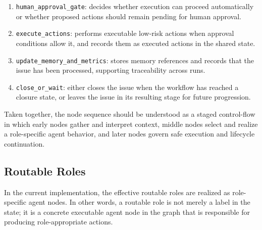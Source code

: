 \documentclass[11pt,a4paper]{article}
\begin{document}
\begin{enumerate}
\begin{itemize}
    \end{itemize}
    \item \texttt{human\_approval\_gate}: decides whether execution can proceed automatically or whether proposed actions should remain pending for human approval.
    \item \texttt{execute\_actions}: performs executable low-risk actions when approval conditions allow it, and records them as executed actions in the shared state.
    \item \texttt{update\_memory\_and\_metrics}: stores memory references and records that the issue has been processed, supporting traceability across runs.
    \item \texttt{close\_or\_wait}: either closes the issue when the workflow has reached a closure state, or leaves the issue in its resulting stage for future progression.
\end{enumerate}

Taken together, the node sequence should be understood as a staged control-flow in which early nodes gather and interpret context, middle nodes select and realize a role-specific agent behavior, and later nodes govern safe execution and lifecycle continuation.

\subsection{Routable Roles}

In the current implementation, the effective routable roles are realized as role-specific agent nodes. In other words, a routable role is not merely a label in the state; it is a concrete executable agent node in the graph that is responsible for producing role-appropriate actions.
\end{document}
